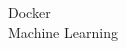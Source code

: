 \chapter*{\glossaryTitle}

{\small\itshape\color{gray} \glossaryHelpText}

\begin{description}
    \item [Docker] \exGlossaryDocker
    \item [Machine Learning] \exGlossaryML
\end{description}
